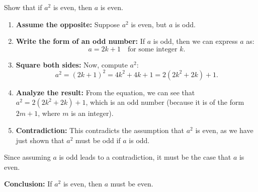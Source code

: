     \begin{example}
            Show that if \( a^2 \) is even, then \( a \) is even.

        \begin{enumerate}
            \item \textbf{Assume the opposite:} 
            Suppose \( a^2 \) is even, but \( a \) is odd.
            
            \item \textbf{Write the form of an odd number:} 
            If \( a \) is odd, then we can express \( a \) as:
            \[
            a = 2k + 1 \quad \text{for some integer } k.
            \]
            
            \item \textbf{Square both sides:} 
            Now, compute \( a^2 \):
            \[
            a^2 = (2k + 1)^2 = 4k^2 + 4k + 1 = 2(2k^2 + 2k) + 1.
            \]
            
            \item \textbf{Analyze the result:} 
            From the equation, we can see that \( a^2 = 2(2k^2 + 2k) + 1 \), which is an odd number (because it is of the form \( 2m + 1 \), where \( m \) is an integer).

            \item \textbf{Contradiction:} 
            This contradicts the assumption that \( a^2 \) is even, as we have just shown that \( a^2 \) must be odd if \( a \) is odd.

        \end{enumerate}

        Since assuming \( a \) is odd leads to a contradiction, it must be the case that \( a \) is even. 

        \textbf{Conclusion:} If \( a^2 \) is even, then \( a \) must be even.
    \end{example}